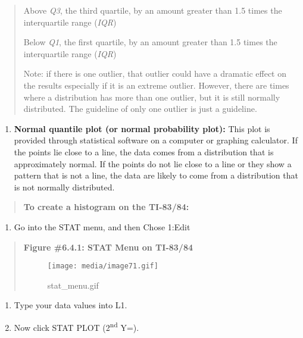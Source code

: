 \documentclass[]{book}
\providecommand{\tightlist}{%
  \setlength{\itemsep}{0pt}\setlength{\parskip}{0pt}}
\begin{document}
\begin{quote}
Above \emph{Q3}, the third quartile, by an amount greater than 1.5 times the interquartile range (\emph{IQR})

Below \emph{Q1}, the first quartile, by an amount greater than 1.5 times the interquartile range (\emph{IQR})

Note: if there is one outlier, that outlier could have a dramatic effect on the results especially if it is an extreme outlier. However, there are times where a distribution has more than one outlier, but it is still normally distributed. The guideline of only one outlier is just a guideline.
\end{quote}

\begin{enumerate}
\def\labelenumi{\arabic{enumi}.}
\setcounter{enumi}{2}
\tightlist
\item
  \textbf{Normal quantile plot (or normal probability plot):} This plot is provided through statistical software on a computer or graphing calculator. If the points lie close to a line, the data comes from a distribution that is approximately normal. If the points do not lie close to a line or they show a pattern that is not a line, the data are likely to come from a distribution that is not normally distributed.
\end{enumerate}

\begin{quote}
\textbf{To create a histogram on the TI-83/84:}
\end{quote}

\begin{enumerate}
\def\labelenumi{\arabic{enumi}.}
\tightlist
\item
  Go into the STAT menu, and then Chose 1:Edit
\end{enumerate}

\begin{quote}
\textbf{Figure \#6.4.1: STAT Menu on TI-83/84}

\begin{figure}
\centering
\texttt{[image: media/image71.gif]}
\caption{stat\_menu.gif}
\end{figure}
\end{quote}

\begin{enumerate}
\def\labelenumi{\arabic{enumi}.}
\setcounter{enumi}{1}
\item
  Type your data values into L1.
\item
  Now click STAT PLOT (2\textsuperscript{nd} Y=).
\end{enumerate}
\end{document}
